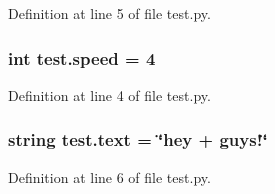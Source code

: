 Definition at line 5 of file test.\-py.

\hypertarget{namespacetest_a551f0d2fc8c5498923ba8a5c3d5ba249}{
\subsubsection[{speed}]{\setlength{\rightskip}{0pt plus 5cm}int test.\-speed = 4}}\label{namespacetest_a551f0d2fc8c5498923ba8a5c3d5ba249}


Definition at line 4 of file test.\-py.

\hypertarget{namespacetest_a3a95a572ec2ff6220a6f946e15b8a213}{
\subsubsection[{text}]{\setlength{\rightskip}{0pt plus 5cm}string test.\-text = \char`\"{}hey + guys!\char`\"{}}}\label{namespacetest_a3a95a572ec2ff6220a6f946e15b8a213}


Definition at line 6 of file test.\-py.

